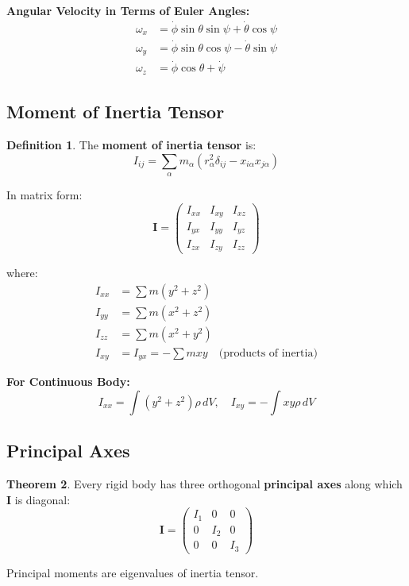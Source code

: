 \documentclass[12pt,a4paper]{article}
\theoremstyle{definition}
\newtheorem{theorem}{Theorem}[section]
\newtheorem{definition}[theorem]{Definition}
\begin{document}
\begin{importantbox}
\textbf{Angular Velocity in Terms of Euler Angles:}
\begin{align}
\omega_x &= \dot{\phi}\sin\theta\sin\psi + \dot{\theta}\cos\psi \\
\omega_y &= \dot{\phi}\sin\theta\cos\psi - \dot{\theta}\sin\psi \\
\omega_z &= \dot{\phi}\cos\theta + \dot{\psi}
\end{align}
\end{importantbox}

\subsection{Moment of Inertia Tensor}

\begin{definition}
The \textbf{moment of inertia tensor} is:
\[
I_{ij} = \sum_\alpha m_\alpha(r_\alpha^2\delta_{ij} - x_{i\alpha}x_{j\alpha})
\]

In matrix form:
\[
\mathbf{I} = \begin{pmatrix}
I_{xx} & I_{xy} & I_{xz} \\
I_{yx} & I_{yy} & I_{yz} \\
I_{zx} & I_{zy} & I_{zz}
\end{pmatrix}
\]

where:
\begin{align}
I_{xx} &= \sum m(y^2 + z^2) \\
I_{yy} &= \sum m(x^2 + z^2) \\
I_{zz} &= \sum m(x^2 + y^2) \\
I_{xy} &= I_{yx} = -\sum mxy \quad \text{(products of inertia)}
\end{align}
\end{definition}

\begin{importantbox}
\textbf{For Continuous Body:}
\[
I_{xx} = \int (y^2 + z^2)\rho\,dV, \quad I_{xy} = -\int xy\rho\,dV
\]
\end{importantbox}

\subsection{Principal Axes}

\begin{theorem}
Every rigid body has three orthogonal \textbf{principal axes} along which $\mathbf{I}$ is diagonal:
\[
\mathbf{I} = \begin{pmatrix}
I_1 & 0 & 0 \\
0 & I_2 & 0 \\
0 & 0 & I_3
\end{pmatrix}
\]

Principal moments are eigenvalues of inertia tensor.
\end{theorem}
\end{document}
